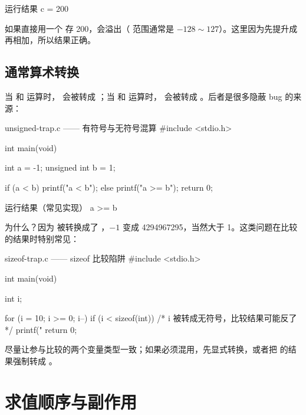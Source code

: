 \begin{outbox}{运行结果}
c = 200
\end{outbox}

如果直接用一个  存 200，会溢出（ 范围通常是 $-128 \sim 127$）。这里因为先提升成  再相加，所以结果正确。

\subsection{通常算术转换}

当  和  运算时， 会被转成 ；当  和  运算时， 会被转成 。后者是很多隐蔽 bug 的来源：

\begin{codebox}{unsigned-trap.c —— 有符号与无符号混算}
#include <stdio.h>

int main(void)
{
    int a = -1;
    unsigned int b = 1;

    if (a < b) {
        printf("a < b\n");
    } else {
        printf("a >= b\n");
    }
    return 0;
}
\end{codebox}

\begin{outbox}{运行结果（常见实现）}
a >= b
\end{outbox}

为什么？因为  被转换成了 ，$-1$ 变成 4294967295，当然大于 1。这类问题在比较  的结果时特别常见：

\begin{codebox}{sizeof-trap.c —— sizeof 比较陷阱}
#include <stdio.h>

int main(void)
{
    int i;

    for (i = 10; i >= 0; i--) {
        if (i < sizeof(int)) {     /* i 被转成无符号，比较结果可能反了 */
            printf("%
        }
    }
    return 0;
}
\end{codebox}

\begin{tipbox}
尽量让参与比较的两个变量类型一致；如果必须混用，先显式转换，或者把  的结果强制转成 。
\end{tipbox}

\section{求值顺序与副作用}


